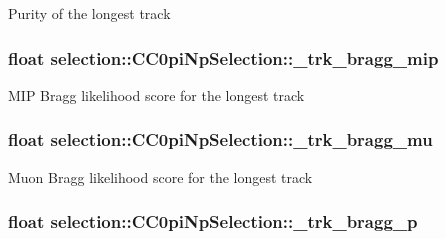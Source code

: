 Purity of the longest track \hypertarget{classselection_1_1CC0piNpSelection_aec1e4d27216773ec40bc66ab5c217abc}{
\subsubsection[{\-\_\-trk\-\_\-bragg\-\_\-mip}]{\setlength{\rightskip}{0pt plus 5cm}float selection\-::\-C\-C0pi\-Np\-Selection\-::\-\_\-trk\-\_\-bragg\-\_\-mip\hspace{0.3cm}{\ttfamily [private]}}}\label{classselection_1_1CC0piNpSelection_aec1e4d27216773ec40bc66ab5c217abc}
M\-I\-P Bragg likelihood score for the longest track \hypertarget{classselection_1_1CC0piNpSelection_a9e7b081beb0ef9129f15a7fb965276f1}{
\subsubsection[{\-\_\-trk\-\_\-bragg\-\_\-mu}]{\setlength{\rightskip}{0pt plus 5cm}float selection\-::\-C\-C0pi\-Np\-Selection\-::\-\_\-trk\-\_\-bragg\-\_\-mu\hspace{0.3cm}{\ttfamily [private]}}}\label{classselection_1_1CC0piNpSelection_a9e7b081beb0ef9129f15a7fb965276f1}
Muon Bragg likelihood score for the longest track \hypertarget{classselection_1_1CC0piNpSelection_a52d578481ee7dd4fed45f8e3c8ed44da}{
\subsubsection[{\-\_\-trk\-\_\-bragg\-\_\-p}]{\setlength{\rightskip}{0pt plus 5cm}float selection\-::\-C\-C0pi\-Np\-Selection\-::\-\_\-trk\-\_\-bragg\-\_\-p\hspace{0.3cm}{\ttfamily [private]}}}\label{classselection_1_1CC0piNpSelection_a52d578481ee7dd4fed45f8e3c8ed44da}

